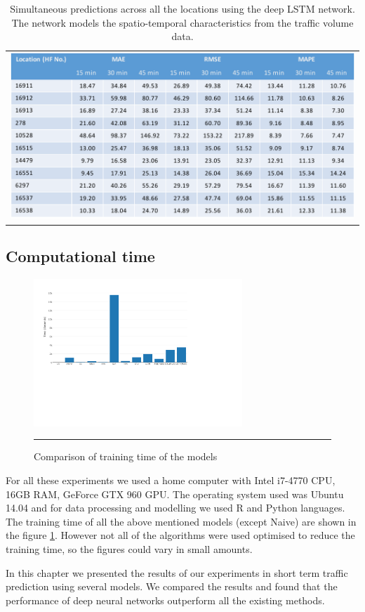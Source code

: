 \begin{table}
    \begin{tabular}{c}
        \includegraphics[width=\textwidth,height=\textheight,keepaspectratio]{Figures/errors-locations-table.pdf}
    \end{tabular}
    \caption[Simultaneous predictions across all the locations]{Simultaneous predictions across all
    the locations using the deep LSTM network. The network models the spatio-temporal characteristics
    from the traffic volume data.}
    \label{table:locationErrors}
\end{table}

\subsection{Computational time}

\begin{figure}[htbp]
    \centering
    \includegraphics[width=0.7\textwidth]{Plots/training-time.pdf}
    \rule{35em}{0.5pt}
   \caption[Comparison of training time of the models]{Comparison of training time of the models}
    \label{fig:trainingTime}
\end{figure}

For all these experiments we used a home computer with Intel i7-4770 CPU, 16GB RAM, GeForce GTX 960
GPU. The operating system used was Ubuntu 14.04 and for data processing and modelling we used R and
Python languages. The training time of all the above mentioned models (except Naive)  are shown in
the figure \ref{fig:trainingTime}. However not all of the algorithms were used optimised to reduce
the training time, so the figures could vary in small amounts.


In this chapter we presented the results of our experiments in short term traffic prediction using
several models. We compared the results and found that the performance of deep neural networks
outperform all the existing methods.